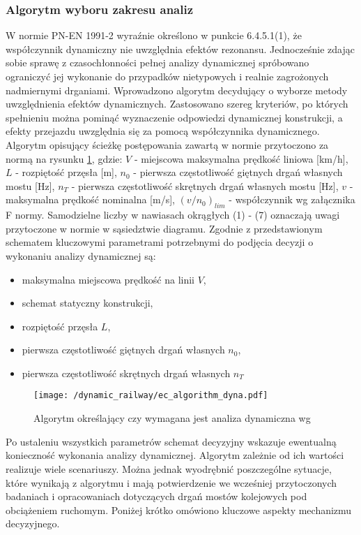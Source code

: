 \subsubsection{Algorytm wyboru zakresu analiz}
W normie PN-EN 1991-2 wyraźnie określono w punkcie 6.4.5.1(1), że współczynnik dynamiczny nie uwzględnia efektów rezonansu. Jednocześnie zdając sobie sprawę z czasochłonności pełnej analizy dynamicznej spróbowano ograniczyć jej wykonanie do przypadków nietypowych i realnie zagrożonych nadmiernymi drganiami. Wprowadzono algorytm decydujący o wyborze metody uwzględnienia efektów dynamicznych. Zastosowano szereg kryteriów, po których spełnieniu można pominąć wyznaczenie odpowiedzi dynamicznej konstrukcji, a efekty przejazdu uwzględnia się za pomocą współczynnika dynamicznego. Algorytm opisujący ścieżkę postępowania zawartą w normie przytoczono za normą \parencite{PKNj} na rysunku \ref{fig:ec_algorithm_dyna}, gdzie: $V$ - miejscowa maksymalna prędkość liniowa [km/h], $L$ - rozpiętość przęsła [m], $n_0$ - pierwsza częstotliwość giętnych drgań własnych mostu [Hz], $n_T$ - pierwsza częstotliwość skrętnych drgań własnych mostu [Hz], $v$ - maksymalna prędkość nominalna [m/s], $(v/n_0)_{lim}$ - współczynnik wg załącznika F normy. Samodzielne liczby w nawiasach okrągłych (1) - (7) oznaczają uwagi przytoczone w normie w sąsiedztwie diagramu. Zgodnie z przedstawionym schematem kluczowymi parametrami potrzebnymi do podjęcia decyzji o wykonaniu analizy dynamicznej są:
\begin{itemize}
	\item maksymalna miejscowa prędkość na linii $V$,
	\item schemat statyczny konstrukcji,
	\item rozpiętość przęsła $L$, 
	\item pierwsza częstotliwość giętnych drgań własnych $n_0$,
	\item pierwsza częstotliwość skrętnych drgań własnych $n_T$
\end{itemize}
\begin{figure}[p]
	\centering
	\texttt{[image: /dynamic\_railway/ec\_algorithm\_dyna.pdf]} 
	\captionsetup{justification=centering}
	\caption{Algorytm określający czy wymagana jest analiza dynamiczna wg \parencite{PKNj}}
	\label{fig:ec_algorithm_dyna}
\end{figure}

Po ustaleniu wszystkich parametrów schemat decyzyjny wskazuje ewentualną konieczność wykonania analizy dynamicznej. Algorytm zależnie od ich wartości realizuje wiele scenariuszy. Można jednak wyodrębnić poszczególne sytuacje, które wynikają z algorytmu i mają potwierdzenie we wcześniej przytoczonych badaniach i opracowaniach dotyczących drgań mostów kolejowych pod obciążeniem ruchomym. Poniżej krótko omówiono kluczowe aspekty mechanizmu decyzyjnego. 

